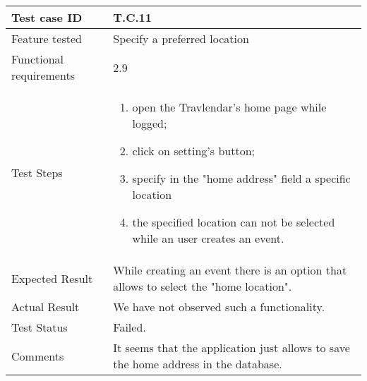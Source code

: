 \begin{table}[H]
	\begin{center}
		\begin{tabular}{ | p{} | p{} | }
		\hline
		Test case ID & T.C.11\\
		\hline
		Feature tested & Specify a preferred location\\
		\hline
		Functional requirements & 2.9\\
		\hline
		Test Steps & 
			\begin{enumerate}
				\item open the Travlendar's home page while logged;
				\item click on setting's button;
				\item specify in the "home address" field a specific location
				\item the specified location can not be selected while an user creates an event.
			\end{enumerate} \\
		\hline
		Expected Result & While creating an event there is an option that allows to select the "home location".\\
		\hline
		Actual Result & We have not observed such a functionality.\\ 
		\hline
		Test Status & \color{Red}Failed.\\ 
		\hline
		Comments & It seems that the application just allows to save the home address in the database.\\ 
		\hline
		\end{tabular}
	\end{center}
\end{table}

